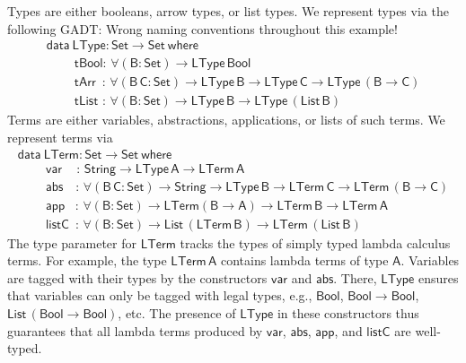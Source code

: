 \documentclass[9pt]{entcs}
\begin{document}
Types are either booleans, arrow types, or list types. We represent
types via the following GADT: {\color{red} Wrong naming conventions
  throughout this example!}
\begin{equation}\label{eq:eq_ltype}
\begin{array}{l}
\mathsf{data\ LType : Set \to Set\ where}\\
\mathsf{\;\;\;\;\;\;\;\;tBool :\, \forall (B : Set) \to LType\,Bool}\\
\mathsf{\;\;\;\;\;\;\;\;tArr\,\,\, :\, \forall (B\,C : Set) \to
  LType\,B \to LType\,C \to LType\,(B \to C)}\\
\mathsf{\;\;\;\;\;\;\;\;tList\,\, :\, \forall (B : Set)
  \to LType\,B \to LType\,(List\,B)}
\end{array}
\end{equation}
Terms are either variables, abstractions, applications, or lists of
such terms. We represent terms via 
\begin{equation}\label{eq:eq_lterm}
\begin{array}{l}
\mathsf{data\ LTerm : Set \to Set\ where}\\
\mathsf{\;\;\;\;\;\;\;\;var\,\,\,\,\,\,\,:\, String \to LType\,A \to
  LTerm\,A} \\  
\mathsf{\;\;\;\;\;\;\;\;abs\,\,\,\,\,\, :\, \forall (B\,C : Set) \to
  String \to LType\,B \to LTerm\,C \to
  LTerm\,(B \to C)}\\ 
  \mathsf{\;\;\;\;\;\;\;\;app\,\,\,\,\, :\, \forall (B : Set) \to
    LTerm (B \to A) \to LTerm\,B \to LTerm\,A} \\ 
  \mathsf{\;\;\;\;\;\;\;\;listC\,\,\, :\, \forall (B : Set) \to
    List\,(LTerm\,B) \to LTerm\,(List \,B)} 
\end{array}
\end{equation}
The type parameter for $\mathsf{LTerm}$ tracks the types of simply
typed lambda calculus terms.  For example, the type
$\mathsf{LTerm\,A}$ contains lambda terms of type $\mathsf{A}$.
Variables are tagged with their types by the constructors
$\mathsf{var}$ and $\mathsf{abs}$. There, $\mathsf{LType}$ ensures
that variables can only be tagged with legal types, e.g.,
$\mathsf{Bool}$, $\mathsf{Bool \to Bool}$, $\mathsf{List\, (Bool \to
  Bool)}$, etc. The presence of $\mathsf{LType}$ in these constructors
thus guarantees that all lambda terms produced by $\mathsf{var}$,
$\mathsf{abs}$, $\mathsf{app}$, and $\mathsf{listC}$ are well-typed.
\end{document}
